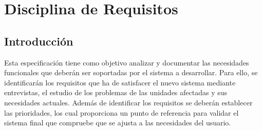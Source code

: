 
\chapter{Disciplina de Requisitos}
\label{chap:requisito}

  \section{Introducción}

    Esta especificación tiene como objetivo analizar y documentar las necesidades funcionales que deberán ser soportadas por el sistema a desarrollar. Para ello, se identificarán los requisitos que ha de satisfacer el nuevo sistema mediante entrevistas, el estudio de los problemas de las unidades afectadas y sus necesidades actuales. Además de identificar los requisitos se deberán establecer las prioridades, los cual proporciona un punto de referencia para validar el sistema final que compruebe que se ajusta a las necesidades del usuario.

